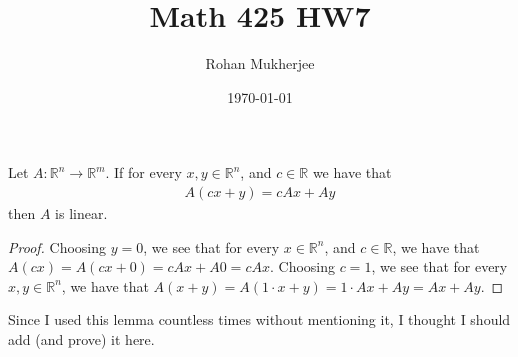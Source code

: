 \documentclass[12pt]{article}
\title{Math 425 HW7}
\date{\today}
\author{Rohan Mukherjee}
\newenvironment{lemma}{\begin{mylemma}}{\end{mylemma}}
\theoremstyle{definitionstyle}
\def\mbb#1{\mathbb{#1}}
\def \R{\mbb{R}}
\begin{document}
	\maketitle
	\begin{lemma}
		Let $A: \R^n \to \R^m$. If for every $x, y \in \R^n$, and $c \in \R$ we have that 
		\begin{align*}
			A(cx+y) = cAx + Ay
		\end{align*}
		then $A$ is linear.
	\end{lemma}
	
	\begin{proof}
		Choosing $y = 0$, we see that for every $x \in \R^n$, and $c \in \R$, we have that $A(cx) = A(cx+0) = cAx + A0 = cAx$. Choosing $c = 1$, we see that for every $x, y \in \R^n$, we have that $A(x+y) = A(1 \cdot x + y) = 1 \cdot Ax + Ay = Ax + Ay$.
	\end{proof}
	Since I used this lemma countless times without mentioning it, I thought I should add (and prove) it here.
\end{document}
